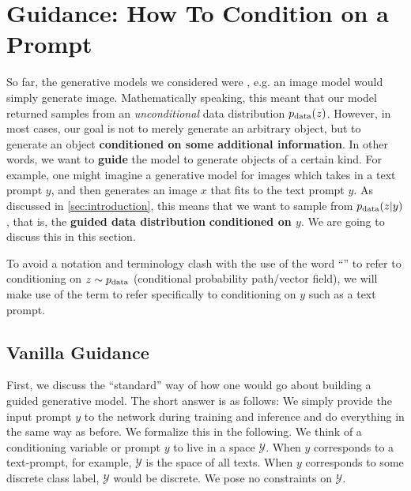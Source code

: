 \section{Guidance: How To Condition on a Prompt}
\label{sec:guidance}

So far, the generative models we considered were , e.g. an image model would simply generate  image. Mathematically speaking, this meant that our model returned samples from an \emph{unconditional} data distribution $p_{\rm{data}}(z)$.  However, in most cases, our goal is not to merely generate an arbitrary object, but to generate an object \textbf{\sffamily conditioned on some additional information}. In other words, we want to \textbf{guide} the model to generate objects of a certain kind.  For example, one might imagine a generative model for images which takes in a text prompt $y$, and then generates an image $x$ that fits to the text prompt $y$. As discussed in \cref{sec:introduction}, this means that we want to sample from $p_{\rm{data}}(z|y)$, that is, the \textbf{guided data distribution} \textbf{\sffamily conditioned on $y$}. We are going to discuss this in this section.

\begin{remarkbox}[Terminology]
To avoid a notation and terminology clash with the use of the word ``'' to refer to conditioning on $z \sim p_{\rm{data}}$ (conditional probability path/vector field), we will make use of the term  to refer specifically to conditioning on $y$ such as a text prompt.
\end{remarkbox}

\subsection{Vanilla Guidance}

First, we discuss the ``standard'' way of how one would go about building a guided generative model. The short answer is as follows: We simply provide the input prompt $y$ to the network during training and inference and do everything in the same way as before. We formalize this in the following. We think of a conditioning variable or prompt $y$ to live in a space $\mathcal{Y}$. When $y$ corresponds to a text-prompt, for example, $\mathcal{Y}$ is the space of all texts. When $y$ corresponds to some discrete class label, $\mathcal{Y}$ would be discrete. We pose no constraints on $\mathcal{Y}$.



